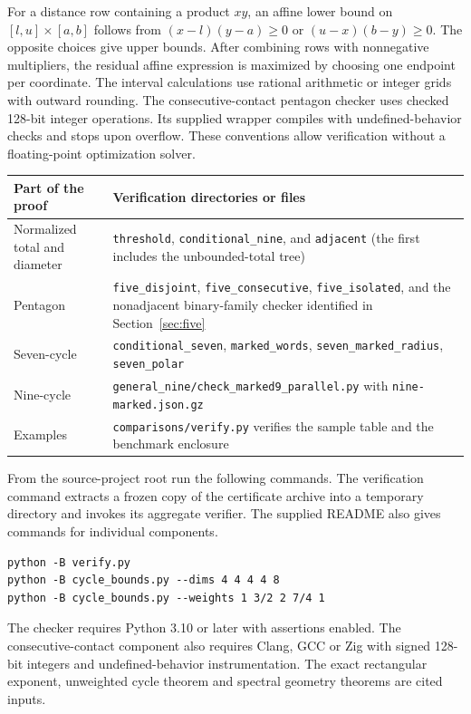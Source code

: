 \documentclass[11pt,a4paper]{article}
\theoremstyle{definition}
\begin{document}
For a distance row containing a product \(xy\), an affine lower bound on \([l,u]\times[a,b]\) follows from \((x-l)(y-a)\ge0\) or \((u-x)(b-y)\ge0\). The opposite choices give upper bounds. After combining rows with nonnegative multipliers, the residual affine expression is maximized by choosing one endpoint per coordinate. The interval calculations use rational arithmetic or integer grids with outward rounding. The consecutive-contact pentagon checker uses checked 128-bit integer operations. Its supplied wrapper compiles with undefined-behavior checks and stops upon overflow. These conventions allow verification without a floating-point optimization solver.

\begin{center}
\small
\begin{tabularx}{\linewidth}{@{}p{.20\linewidth}X@{}}
\toprule
Part of the proof & Verification directories or files\\
\midrule
Normalized total and diameter & \texttt{threshold}, \texttt{conditional\_nine}, and \texttt{adjacent} (the first includes the unbounded-total tree)\\
Pentagon & \texttt{five\_disjoint}, \texttt{five\_consecutive}, \texttt{five\_isolated}, and the nonadjacent binary-family checker identified in Section~\ref{sec:five}\\
Seven-cycle & \texttt{conditional\_seven}, \texttt{marked\_words}, \texttt{seven\_marked\_radius}, \texttt{seven\_polar}\\
Nine-cycle & \texttt{general\_nine/check\_marked9\_parallel.py} with \texttt{nine-marked.json.gz}\\
Examples & \texttt{comparisons/verify.py} verifies the sample table and the benchmark enclosure\\
\bottomrule
\end{tabularx}
\end{center}

From the source-project root run the following commands. The verification command extracts a frozen copy of the certificate archive into a temporary directory and invokes its aggregate verifier. The supplied README also gives commands for individual components.
\begin{verbatim}
python -B verify.py
python -B cycle_bounds.py --dims 4 4 4 4 8
python -B cycle_bounds.py --weights 1 3/2 2 7/4 1
\end{verbatim}
The checker requires Python 3.10 or later with assertions enabled. The consecutive-contact component also requires Clang, GCC or Zig with signed 128-bit integers and undefined-behavior instrumentation. The exact rectangular exponent, unweighted cycle theorem and spectral geometry theorems are cited inputs.
\end{document}
